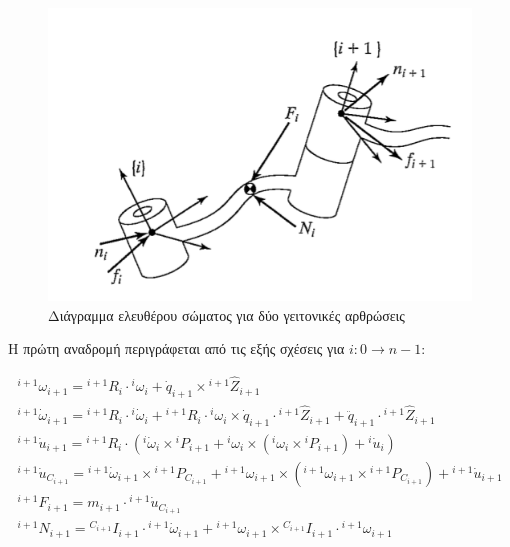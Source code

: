 \begin{figure}[H]
    \centering
    \includegraphics[width=.7\textwidth]{rigidbody/fig/force-balance.png}
    \caption{Διάγραμμα ελευθέρου σώματος για δύο γειτονικές αρθρώσεις\cite{craig95}}
    \label{fig:force-balance}
\end{figure}

Η πρώτη αναδρομή περιγράφεται από τις εξής σχέσεις για $i : 0 \rightarrow n-1$:

\begin{equation}
    \begin{aligned}
        ^{i+1}\omega_{i+1} = {}^{i+1}R_i \cdot {}^i\omega_i +
        \dot{q}_{i+1} \times {}^{i+1}\hat{Z}_{i+1}\\[10pt]
        ^{i+1}\dot{\omega}_{i+1} = {}^{i+1}R_i \cdot {}^i\dot{\omega}_i +
        {}^{i+1}R_i \cdot {}^i\omega_i \times \dot{q}_{i+1} \cdot
        {}^{i+1}\hat{Z}_{i+1} + \ddot{q}_{i+1} \cdot
        {}^{i+1}\hat{Z}_{i+1}\\[10pt]
        ^{i+1}\dot{u}_{i+1} = {}^{i+1}R_i \cdot (^i\dot{\omega}_i \times
        {}^iP_{i+1} + {}^i\omega_i \times (^i\omega_i \times {}^iP_{i+1}) +
        {}^i\dot{u}_i)\\[10pt]
        ^{i+1}\dot{u}_{C_{i+1}} = {}^{i+1}\dot{\omega}_{i+1} \times
        {}^{i+1}P_{C_{i+1}} + {}^{i+1}\omega_{i+1} \times (^{i+1}\omega_{i+1}
        \times {}^{i+1}P_{C_{i+1}}) + {}^{i+1}\dot{u}_{i+1}\\[10pt]
        ^{i+1}F_{i+1} = m_{i+1} \cdot {}^{i+1}\dot{u}_{C_{i+1}}\\[10pt]
        ^{i+1}N_{i+1} = {}^{C_{i+1}}I_{i+1} \cdot {}^{i+1}\dot{\omega}_{i+1} +
        {}^{i+1}\omega_{i+1} \times {}^{C_{i+1}}I_{i+1} \cdot {}^{i+1}\omega_{i+1}
    \end{aligned}
    \label{equ:iterative-NE-first}
\end{equation}

